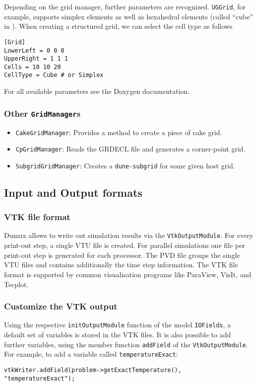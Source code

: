 Depending on the grid manager, further parameters are recognized.
\texttt{UGGrid}, for example, supports simplex elements as well as hexahedral elements
(called ``cube'' in \Dune). When creating a structured grid, we can select the cell type as follows
\begin{lstlisting}[style=DumuxParameterFile]
[Grid]
LowerLeft = 0 0 0
UpperRight = 1 1 1
Cells = 10 10 20
CellType = Cube # or Simplex
\end{lstlisting}

For all available parameters see the Doxygen documentation.

\subsubsection{Other \Dumux \texttt{GridManager}s}
\begin{itemize}
\item \texttt{CakeGridManager}: Provides a method to create a piece of cake grid.
\item \texttt{CpGridManager}: Reads the GRDECL file and generates a corner-point grid.
\item \texttt{SubgridGridManager}: Creates a \texttt{dune-subgrid} for some given host grid.
\end{itemize}

\subsection{Input and Output formats}

\subsubsection{VTK file format}
Dumux allows to write out simulation results via the \texttt{VtkOutputModule}.
For every print-out step, a single VTU file is created. For parallel simulations one file
per print-out step is generated for each processor.
The PVD file groups the single VTU files and contains additionally the time step information.
The VTK file format is supported by common visualisation programs like ParaView, VisIt, and Tecplot.

\subsubsection{Customize the VTK output}
Using the respective \texttt{initOutputModule} function of the model \texttt{IOFields}, a default
set of variables is stored in the VTK files. It is also possible to add further variables,
using the member function \texttt{addField} of the \texttt{VtkOutputModule}. For example, to add a variable called \texttt{temperatureExact}:
\begin{lstlisting}[style=DumuxCode]
vtkWriter.addField(problem->getExactTemperature(), "temperatureExact");
\end{lstlisting}

